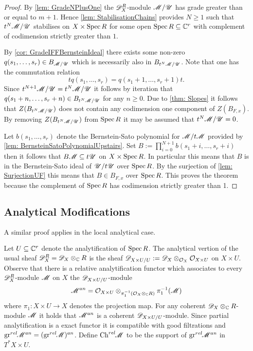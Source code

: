 \begin{proof}
  By \cref{lem: GradeNPlusOne} the $\mathscr{D}_X^R$-module $\mathscr{M}/\mathscr{U}$ has grade greater than or equal to $m + 1$.
  Hence \cref{lem: StabilisationChains} provides $N\geq 1$ such that $t^N\mathscr{M}/\mathscr{U}$ stabilises on $X\times\operatorname{Spec} R$ for some open $\operatorname{Spec} R\subseteq \mathbb{C}^r$ with complement of codimension strictly greater than $1$.

  By \cref{cor: GradeIFFBernsteinIdeal} there exists some non-zero $q(s_1,\ldots,s_r) \in B_{\mathscr{M}/\mathscr{U}}$ which is necessarily also in $B_{t^N\mathscr{M}/\mathscr{U}}$.
  Note that one has the commutation relation
  $$tq(s_1,\ldots,s_r) = q(s_1+1,\ldots, s_r + 1)t.$$
  Since $t^{N+1}\mathscr{M}/\mathscr{U} = t^N\mathscr{M}/\mathscr{U}$ it follows by iteration that $q(s_1+n,\ldots, s_r + n)\in B_{t^N \mathscr{M}/\mathscr{U}}$ for any $n\geq 0$.
  Due to \cref{thm: Slopes} it follows that $Z(B_{t^N\mathscr{M}/\mathscr{U}})$ does not contain any codimension one component of $Z(B_{F,x})$.
  By removing $Z(B_{t^N\mathscr{M}/\mathscr{U}})$ from $\operatorname{Spec} R$ it may be assumed that $t^N\mathscr{M}/\mathscr{U} = 0$.

  Let $b(s_1,\ldots,s_r)$ denote the Bernstein-Sato polynomial for $\mathscr{M}/t\mathscr{M}$ provided by \cref{lem: BernsteinSatoPolynomialUpstairs}.
  Set $B := \prod_{i=0}^{N+1} b(s_1 + i, \ldots, s_r + i)$ then it follows that
  $B\mathscr{M} \subseteq t\mathscr{U}$ on $X \times \operatorname{Spec} R$.
  In particular this means that $B$ is in the Bernstein-Sato ideal of $\mathscr{U}/t\mathscr{U}$ over $\operatorname{Spec} R$.
  By the surjection of \cref{lem: SurjectionUF} this means that $B\in B_{F,x}$ over $\operatorname{Spec} R$. This proves the theorem because the complement of $\operatorname{Spec} R$ has codimension strictly greater than 1.
\end{proof}
\subsection{Analytical Modifications}
A similar proof applies in the local analytical case.

Let $U\subseteq \mathbb{C}^r$ denote the analytification of $\operatorname{Spec} R$.
The analytical vertion of the usual sheaf $\mathscr{D}_X^R = \mathscr{D}_X \otimes_{\mathbb{C}} R$ is the sheaf $\mathscr{D}_{X\times U/U}:= \mathscr{D}_X \otimes_{\mathcal{O}_X}\mathcal{O}_{X\times U}$ on $X\times U$.
Observe that there is a relative analytification functor which associates to every $\mathscr{D}_X^R$-module $\mathscr{M}$ on $X$ the $\mathscr{D}_{X\times U/U}$-module
$$\mathscr{M}^{an} = \mathcal{O}_{X\times U} \otimes_{\pi_1^{-1}(\mathcal{O}_X\otimes_{\mathbb{C}} R)} \pi_1^{-1}(\mathscr{M})$$
where $\pi_1:X\times U \to X$ denotes the projection map.
For any coherent $\mathscr{D}_X\otimes_{\mathbb{C}}R$-module $\mathscr{M}$ it holds that $\mathscr{M}^{an}$ is a coherent $\mathscr{D}_{X\times U/U}$-module.
Since partial analytification is a exact functor it is compatible with good filtrations and $\operatorname{gr}^{rel}\mkern-5mu \mathscr{M}^{an}= (\operatorname{gr}^{rel}\mkern-5mu \mathscr{M})^{an}$. Define $\operatorname{Ch}^{rel}\mkern-5mu \mathscr{M}$ to be the support of $\operatorname{gr}^{rel}\mkern-5mu\mathscr{M}^{an}$ in $T^*X\times U$.


